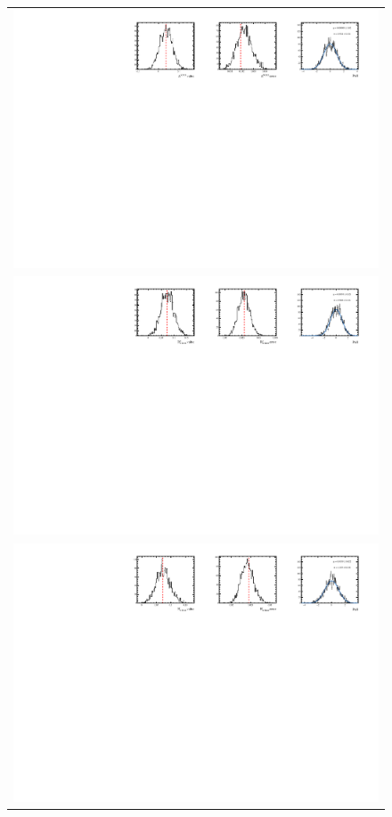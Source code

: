 \begin{figure}
  \centering
  \begin{tabular}{c}
\includegraphics[width=\textwidth]{ANA_resources/Plots/Data_fit/FitterBias//split//A_signal_Kpipipi.pdf} \\
\includegraphics[width=\textwidth]{ANA_resources/Plots/Data_fit/FitterBias//split//R_signal_piKpipi_plus.pdf} \\
\includegraphics[width=\textwidth]{ANA_resources/Plots/Data_fit/FitterBias//split//R_signal_piKpipi_minus.pdf} \\

\end{tabular}
\end{figure}

